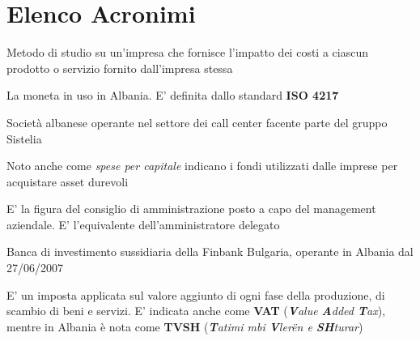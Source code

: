 \section*{Elenco Acronimi}
\begin{acronym}
\begin{multicols}{2}
		   {\newline \small Metodo di studio su un'impresa che fornisce l'impatto dei costi a ciascun prodotto o servizio fornito dall'impresa stessa \par}


		   {\newline \small La moneta in uso in Albania. E' definita dallo standard \textbf{ISO 4217}  \par}

		   {\newline \small Società albanese operante nel settore dei call center facente parte del gruppo Sistelia \par}

		   {\newline \small Noto anche come \textit{spese per capitale} indicano i fondi utilizzati dalle imprese per acquistare asset durevoli  \par}

		   {\newline \small E' la figura del consiglio di amministrazione posto a capo del management aziendale. E' l'equivalente dell'amministratore delegato  \par}

		   {\newline \small Banca di investimento sussidiaria della Finbank Bulgaria, operante in Albania dal 27/06/2007\cite{finbank_al} \par}


		   {\newline \small E' un imposta applicata sul valore aggiunto di ogni fase della produzione, di scambio di beni e servizi. E' indicata anche come \textbf{VAT} (\textit{\textbf{V}alue \textbf{A}dded \textbf{T}ax}), mentre in Albania è nota come \textbf{TVSH} (\textit{\textbf{T}atimi mbi \textbf{V}ler\"en e \textbf{SH}turar}) \par}


\end{multicols}
\end{acronym}
